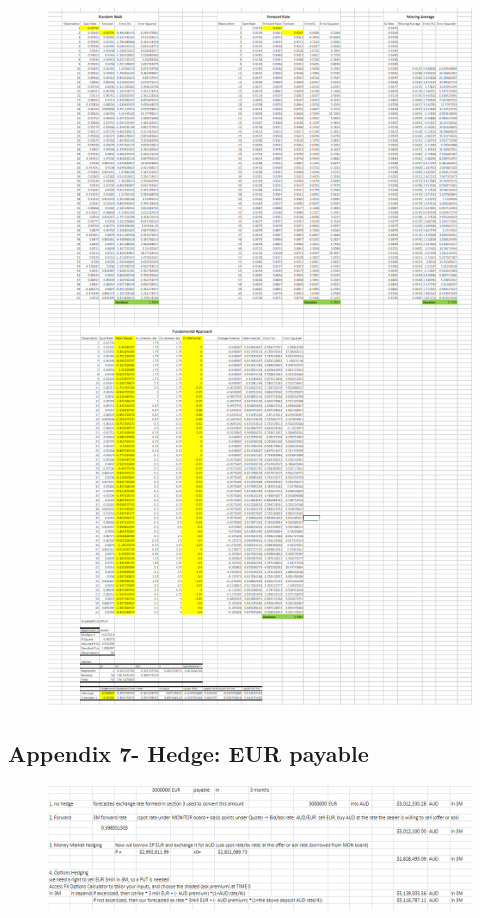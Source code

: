\documentclass{article}
\let\Oldsubsection\subsection
\renewcommand{\subsection}{\FloatBarrier\Oldsubsection}
\begin{document}
\begin{figure}[h!]
    \centering
    \includegraphics[scale=0.5]{forecasts/CAD.png}
\end{figure}

\subsection*{Appendix 7- Hedge: EUR payable}

\begin{figure}[h!]
    \centering
    \includegraphics[scale=0.5]{hedge/pay-EUR.png}
\end{figure}
\end{document}
